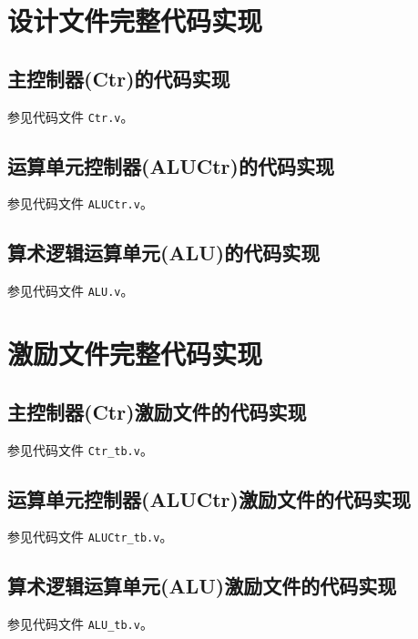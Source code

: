 \documentclass{cumcm}
\numberwithin{equation}{section}
\numberwithin{equation}{subsection}
\begin{document}
\clearpage
\begin{appendices}
\section{设计文件完整代码实现}\label{appsection1}
\subsection{主控制器(Ctr)的代码实现}\label{appsection1.1}
参见代码文件 \texttt{Ctr.v}。
\subsection{运算单元控制器(ALUCtr)的代码实现}\label{appsection1.2}
参见代码文件 \texttt{ALUCtr.v}。
\subsection{算术逻辑运算单元(ALU)的代码实现}\label{appsection1.3}
参见代码文件 \texttt{ALU.v}。
\section{激励文件完整代码实现}\label{appsection2}
\subsection{主控制器(Ctr)激励文件的代码实现}\label{appsection2.1}
参见代码文件 \texttt{Ctr\_tb.v}。
\subsection{运算单元控制器(ALUCtr)激励文件的代码实现}\label{appsection2.2}
参见代码文件 \texttt{ALUCtr\_tb.v}。
\subsection{算术逻辑运算单元(ALU)激励文件的代码实现}\label{appsection2.3}
参见代码文件 \texttt{ALU\_tb.v}。
\end{appendices}
\end{document}
